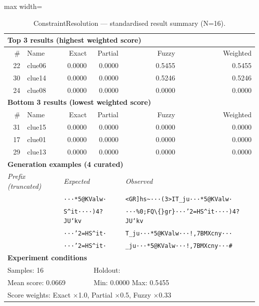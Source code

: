 \begin{table}[htbp]
\centering
\caption{ConstraintResolution — standardised result summary (N=16).}
\label{tab:constraintresolution_summary}
\begin{adjustbox}{max width=\textwidth}
\begin{tabular}{r p{5cm} r r r r}
\toprule
\multicolumn{6}{l}{\textbf{Top 3 results (highest weighted score)}} \\
\midrule
\# & Name & Exact & Partial & Fuzzy & Weighted \\
\midrule
22 & clue06 & 0.0000 & 0.0000 & 0.5455 & 0.5455 \\
30 & clue14 & 0.0000 & 0.0000 & 0.5246 & 0.5246 \\
24 & clue08 & 0.0000 & 0.0000 & 0.0000 & 0.0000 \\
\midrule
\multicolumn{6}{l}{\textbf{Bottom 3 results (lowest weighted score)}} \\
\midrule
\# & Name & Exact & Partial & Fuzzy & Weighted \\
\midrule
31 & clue15 & 0.0000 & 0.0000 & 0.0000 & 0.0000 \\
17 & clue01 & 0.0000 & 0.0000 & 0.0000 & 0.0000 \\
29 & clue13 & 0.0000 & 0.0000 & 0.0000 & 0.0000 \\
\midrule
\multicolumn{6}{l}{\textbf{Generation examples (4 curated)}} \\
\midrule
\multicolumn{2}{l}{\textit{Prefix (truncated)}} & \multicolumn{2}{l}{\textit{Expected}} & \multicolumn{2}{l}{\textit{Observed}} \\
\midrule
\multicolumn{2}{l}{\texttt{}} & \multicolumn{2}{l}{\texttt{···*5@KValw·}} & \multicolumn{2}{l}{\texttt{<GR]hs\textasciitilde{}···(3>IT\_ju···*5@KValw·}} \\
\multicolumn{2}{l}{\texttt{}} & \multicolumn{2}{l}{\texttt{S\^{}it····)4?JU`kv}} & \multicolumn{2}{l}{\texttt{···\%0;FQ\textbackslash\{\}gr\}···'2=HS\^{}it····)4?JU`kv}} \\
\multicolumn{2}{l}{\texttt{}} & \multicolumn{2}{l}{\texttt{···'2=HS\^{}it·}} & \multicolumn{2}{l}{\texttt{T\_ju···*5@KValw···!,7BMXcny···}} \\
\multicolumn{2}{l}{\texttt{}} & \multicolumn{2}{l}{\texttt{···'2=HS\^{}it·}} & \multicolumn{2}{l}{\texttt{\_ju···*5@KValw···!,7BMXcny···\#}} \\
\midrule
\multicolumn{6}{l}{\textbf{Experiment conditions}} \\
\midrule
\multicolumn{3}{l}{Samples: 16} & \multicolumn{3}{l}{Holdout: } \\
\multicolumn{3}{l}{Mean score: 0.0669} & \multicolumn{3}{l}{Min: 0.0000 \quad Max: 0.5455} \\
\multicolumn{6}{l}{Score weights: Exact $\times$1.0, Partial $\times$0.5, Fuzzy $\times$0.33} \\
\bottomrule
\end{tabular}
\end{adjustbox}
\end{table}
